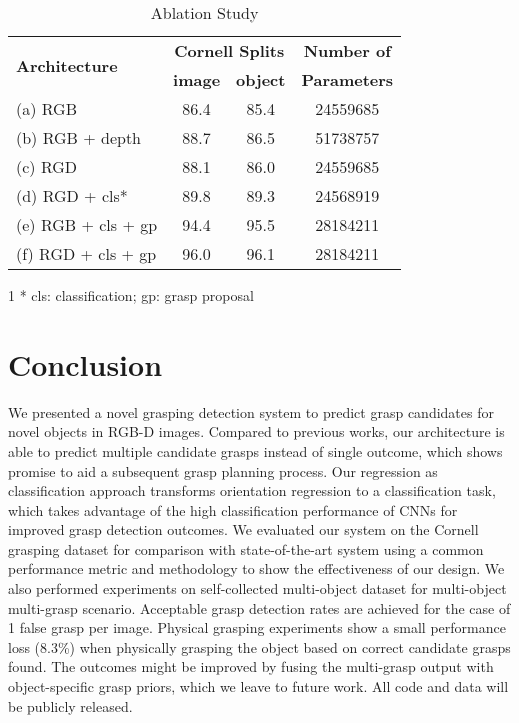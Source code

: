 \documentclass[letterpaper, 10 pt, journal, twoside]{IEEEtran}
\begin{document}
\begin {table}[t]
  \centering
  \vspace*{0.07in}
\caption {Ablation Study  }
  \small
  \begin{tabular}{ | l | c | c | c |}
    \hline
\multirow{2}{*}{\centering \bf Architecture} &
    \multicolumn{2}{|c|}{\bf{Cornell Splits}} &  \bf{Number of} \\ 
    \cline{2-3}                   & \bf{image} & \bf{object} & \bf{Parameters}
    \\ \hline
    (a) RGB                       & 86.4   &  85.4     &  24559685  \\ \hline
    (b) RGB + depth               & 88.7   &  86.5     &  51738757  \\ \hline 
    (c) RGD                       & 88.1   &  86.0     &  24559685  \\ \hline 
    (d) RGD + cls*                & 89.8   &  89.3     &  24568919  \\ \hline 
    (e) RGB + cls + gp            & 94.4   &  95.5     &  28184211  \\ \hline 
    (f) RGD + cls + gp            & 96.0   &  96.1     &  28184211  \\ \hline
  \end{tabular}
    \begin{tablenotes}
        \footnotesize
        \item[1] * cls: classification; gp: grasp proposal
        \end{tablenotes}
\vspace*{-0.05in}
\end {table}


 
\section{Conclusion}
We presented a novel grasping detection system to predict grasp
candidates for novel objects in RGB-D images. Compared to previous
works, our architecture is able to predict multiple candidate grasps
instead of single outcome, which shows promise to aid a subsequent grasp
planning process. 
Our regression as classification approach transforms orientation
regression to a classification task, which takes advantage of the high
classification performance of CNNs for improved grasp detection outcomes.
We evaluated our system on the Cornell grasping dataset for comparison
with state-of-the-art system using a common performance metric and
methodology to show the effectiveness of our design. We also performed
experiments on self-collected multi-object dataset for multi-object
multi-grasp scenario.   
Acceptable grasp detection rates are achieved
for the case of 1 false grasp per image.
Physical grasping experiments show a small performance loss (8.3\%)
when physically grasping the object based on correct candidate grasps found.
The outcomes might be improved by fusing the multi-grasp output with
object-specific grasp priors, which we leave to future work.
All code and data will be publicly released.   
 

\ifCLASSOPTIONcaptionsoff
  \newpage
\fi

\end{document}
